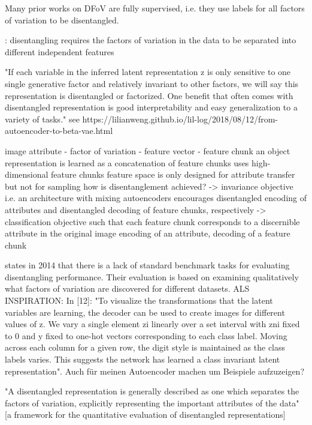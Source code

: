 \documentclass[12pt,a4paper]{article}
\begin{document}
\par Many prior works on DFoV are fully supervised, i.e. they use labels for all factors of variation to be disentangled.

\par [55]: disentangling requires the factors of variation in the data to be separated into different independent features

\par "If each variable in the inferred latent representation z is only sensitive to one single generative factor and relatively invariant to other factors, we will say this representation is disentangled or factorized. One benefit that often comes with disentangled representation is good interpretability and easy generalization to a variety of tasks." see https://lilianweng.github.io/lil-log/2018/08/12/from-autoencoder-to-beta-vae.html

\par image attribute - factor of variation - feature vector - feature chunk
an object representation is learned as a concatenation of feature chunks
uses high-dimensional feature chunks
feature space is only designed for attribute transfer but not for sampling
how is disentanglement achieved? 
-> invariance objective i.e. an architecture with mixing autoencoders encourages disentangled encoding of attributes and disentangled decoding of feature chunks, respectively
-> classification objective such that each feature chunk corresponds to a discernible attribute in the original image 
encoding of an attribute, decoding of a feature chunk

\par\cite{1412.6583} states in 2014 that there is a lack of standard benchmark tasks for evaluating disentangling performance. Their evaluation is based on examining qualitatively what factors of variation are discovered for different datasets. ALS INSPIRATION: In [12]: "To visualize the transformations that the latent variables are learning, the decoder can be used to create images for different values of z. We vary a single element zi linearly over a set interval with zni fixed to 0 and y fixed to one-hot vectors corresponding to each class label. Moving across each column for a given row, the digit style is maintained as the class labels varies. This suggests the network has learned a class invariant latent representation". Auch für meinen Autoencoder machen um Beispiele aufzuzeigen?

\par "A disentangled representation is generally described as one which separates the factors of variation, explicitly representing the important attributes of the data" [a framework for the quantitative evaluation of disentangled representations]
\end{document}
